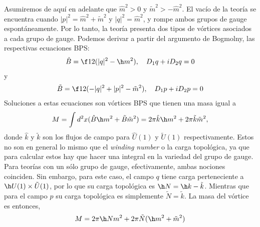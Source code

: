 Asumiremos de aquí en adelante que $\hat m^2>0$ y $\tilde m^2>-\hat m^2$. El vacío de la teoría se encuentra cuando $|p|^2 = \hat m^2+\tilde m^2$ y $|q|^2=\hat m^2$, y rompe ambos grupos de gauge espontáneamente. Por lo tanto, la teoría presenta dos tipos de vórtices asociados a cada grupo de gauge. Podemos derivar a partir del argumento de Bogmolny, las respectivas ecuaciones BPS:
\begin{align}
	\hat B = \f 12(|q|^2-\h m^2), \ \ \ D_1q+iD_2 q =0
\end{align}
y
\begin{align}
	\tilde B = \f 12(-|q|^2+|p|^2-\tilde m^2), \ \ \ D_1 p+iD_2p =0
\end{align}
Soluciones a estas ecuaciones son vórtices BPS que tienen una masa igual a
\begin{align}
	M = \int d^2x (\hat B\h m^2+\tilde B\tilde m^2) = 2\pi\hat k\h m^2+2\pi\tilde k\tilde m^2,
\end{align}
donde $\hat k$ y $\tilde k$ son los flujos de campo para $\hat U(1)$ y $\tilde U(1)$ respectivamente. Estos no son en general lo mismo que el \emph{winding number} o la carga topológica, ya que para calcular estos hay que hacer una integral en la variedad del grupo de gauge. Para teorías con un sólo grupo de gauge, efectivamente, ambas nociones coinciden. Sin embargo, para este caso, el campo $q$ tiene carga perteneciente a $\h U(1)\times\tilde U(1)$,  por lo que su carga topológica es $\h N=\h k-\tilde k$. Mientras que para el campo $p$ su carga topológica es simplemente $\tilde N=\tilde k$. La masa del vórtice es entonces,
\begin{align}
	M = 2\pi\h N m^2+2\pi\tilde N(\h m^2+\tilde m^2)
\end{align}